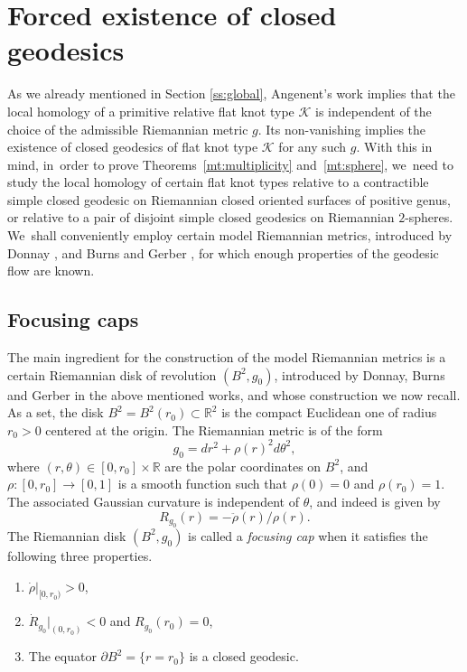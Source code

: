 \documentclass[11pt]{article}
\newcommand{\R}{\mathbb{R}}
\newcommand{\KK}{\mathcal{K}}
\theoremstyle{plain}
\theoremstyle{definition}
\begin{document}
\section{Forced existence of closed geodesics}
\label{s:forcing}

As we already mentioned in Section \ref{ss:global}, Angenent's work \cite{Angenent:2005aa} implies that the local homology of a primitive relative flat knot type $\KK$ is independent of the choice of the admissible Riemannian metric $g$.
Its non-vanishing implies the existence of closed geodesics of flat knot type $\KK$ for any such $g$. With this in mind, in~order to prove Theorems~\ref{mt:multiplicity} and~\ref{mt:sphere}, we~need to study the local homology of certain flat knot types relative to a contractible simple closed geodesic on Riemannian closed oriented surfaces of positive genus, or relative to a pair of disjoint simple closed geodesics on Riemannian $2$-spheres. We~shall conveniently employ certain model Riemannian metrics, introduced by Donnay \cite{Donnay:1988ab}, and Burns and Gerber \cite{Burns:1989aa}, for which enough properties of the geodesic flow are known.

\subsection{Focusing caps}
The main ingredient for the construction of the model Riemannian metrics is a certain Riemannian disk of revolution $(B^2,g_0)$, introduced by Donnay, Burns and Gerber in the above mentioned works, and whose construction we now recall.
As a set, the disk $B^2=B^2(r_0)\subset\R^2$ is the compact Euclidean one of radius $r_0>0$ centered at the origin. The Riemannian metric is of the form
\[
g_0 = dr^2+\rho(r)^2d\theta^2,
\]
where $(r,\theta)\in[0,r_0]\times\R$ are the polar coordinates on $B^2$, and $\rho:[0,r_0]\to[0,1]$ is a smooth function such that $\rho(0)=0$ and $\rho(r_0)=1$. The associated Gaussian curvature is independent of $\theta$, and indeed is given by
\[
R_{g_0}(r)=-\ddot\rho(r)/\rho(r).
\]
The Riemannian disk $(B^2,g_0)$ is called a \emph{focusing cap} when it satisfies the following three properties.
\begin{enumerate}
\item
$\dot\rho|_{[0,r_0)}>0$,

\item
$\dot R_{g_0}|_{(0,r_0)}<0$ and $R_{g_0}(r_0)=0$,

\item
The equator $\partial B^2=\{r=r_0\}$ is a closed geodesic.
\end{enumerate}
\end{document}
